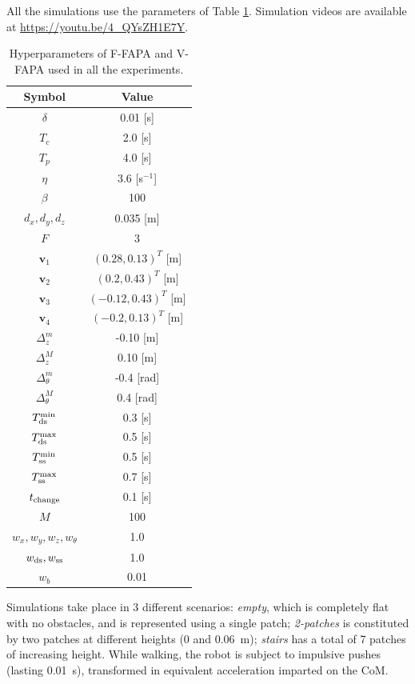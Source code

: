 All the simulations use the parameters of Table \ref{tab:FAPA:hyperparameters}. Simulation videos are available at \url{https://youtu.be/4_QYsZH1E7Y}.

\begin{table}
    \centering
    \begin{tabular}{ |c|c| } 
        \hline
        Symbol & Value \\
        \hline
        $\delta$ & 0.01 [s] \\
        $T_c$ & 2.0 [s] \\
        $T_p$ & 4.0 [s] \\
        $\eta$ & 3.6 [s$^{-1}$] \\
        $\beta$ & 100 \\
        $d_x, d_y, d_z$ & 0.035 [m] \\
        $F$ & 3 \\
        $\bm{v}_1$ & $(0.28, 0.13)^T $ [m] \\
        $\bm{v}_2$ & $(0.2, 0.43)^T$ [m] \\
        $\bm{v}_3$ & $(-0.12, 0.43)^T$ [m] \\
        $\bm{v}_4$ & $(-0.2, 0.13)^T$ [m] \\
        $\Delta_z^m$ & -0.10 [m] \\
        $\Delta_z^M$ & 0.10 [m] \\
        $\Delta_{\theta}^m$ & -0.4 [rad] \\
        $\Delta_{\theta}^M$ & 0.4 [rad] \\
        $T_{\rm ds}^{\min}$ & 0.3 [s] \\
        $T_{\rm ds}^{\max}$ & 0.5 [s] \\
        $T_{\rm ss}^{\min}$ & 0.5 [s] \\
        $T_{\rm ss}^{\max}$ & 0.7 [s] \\
        $t_{\rm change}$ & 0.1 [s] \\
        $M$ & 100 \\
        $w_x, w_y, w_z, w_{\theta}$ & 1.0 \\
        $w_{\rm ds}, w_{\rm ss}$ & 1.0 \\
        $w_b$ & 0.01 \\
        \hline
    \end{tabular}
    \caption{Hyperparameters of F-FAPA and V-FAPA used in all the experiments.}
    \label{tab:FAPA:hyperparameters}
\end{table}

Simulations take place in 3 different scenarios: {\em empty}, which is completely flat with no obstacles, and is represented using a single patch; {\em 2-patches} is constituted by two patches at different heights (0 and 0.06~m); {\em stairs} has a total of 7 patches of increasing height. While walking, the robot is subject to impulsive pushes (lasting 0.01~s), transformed in equivalent acceleration imparted on the CoM.

